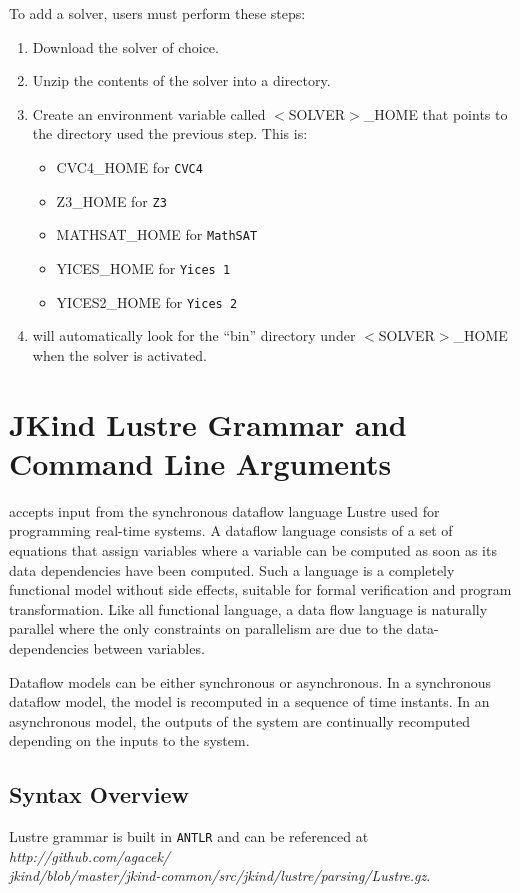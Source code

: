 To add a solver, users must perform these steps:
\begin{enumerate}
  \item Download the solver of choice.
  \item Unzip the contents of the solver into a directory.
  \item Create an environment variable called $<$SOLVER$>$\_HOME that points to the directory used the previous step. This is:
      \begin{itemize}
        \item CVC4\_HOME for \texttt{CVC4}
        \item Z3\_HOME for \texttt{Z3}
        \item MATHSAT\_HOME for \texttt{MathSAT}
        \item YICES\_HOME for \texttt{Yices 1}
        \item YICES2\_HOME for \texttt{Yices 2}
      \end{itemize}
  \item \jkind will automatically look for the ``bin'' directory under $<$SOLVER$>$\_HOME when the solver is activated.
\end{enumerate}


\section{{\sc JKind} Lustre Grammar and Command Line Arguments}
\jkind accepts input from the synchronous dataflow language Lustre used for programming real-time systems. A dataflow language consists of a set of equations that assign variables where a variable can be computed as soon as its data dependencies have been computed. Such a language is a completely functional model without side effects, suitable for formal verification and program transformation. Like all functional language, a data flow language is naturally parallel where the only constraints on parallelism are due to the data-dependencies between variables.

Dataflow models can be either synchronous or asynchronous. In a synchronous dataflow model, the model is recomputed in a sequence of time instants. In an asynchronous model, the outputs of the system are continually recomputed depending on the inputs to the system.

\subsection{Syntax Overview}
\jkind Lustre grammar is built in \texttt{ANTLR} and can be referenced at
\emph{http://github.com/agacek/\\jkind/blob/master/jkind-common/src/jkind/lustre/parsing/Lustre.gz}.

